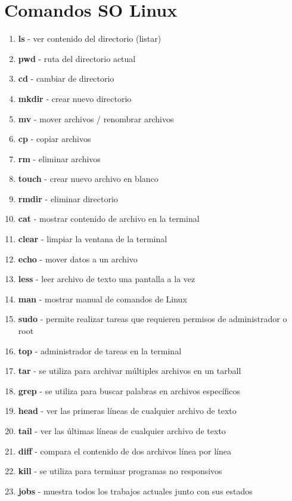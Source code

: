 \chapter{Comandos SO Linux}


\begin{enumerate}
\item \textbf{ls} - ver contenido del directorio (listar)
\item \textbf{pwd} - ruta del directorio actual
\item \textbf{cd} - cambiar de directorio
\item \textbf{mkdir} - crear nuevo directorio
\item \textbf{mv} - mover archivos / renombrar archivos
\item \textbf{cp} - copiar archivos
\item \textbf{rm} - eliminar archivos
\item \textbf{touch} - crear nuevo archivo en blanco
\item \textbf{rmdir} - eliminar directorio
\item \textbf{cat} - mostrar contenido de archivo en la terminal
\item \textbf{clear} - limpiar la ventana de la terminal
\item \textbf{echo} - mover datos a un archivo
\item \textbf{less} - leer archivo de texto una pantalla a la vez
\item \textbf{man} - mostrar manual de comandos de Linux
\item \textbf{sudo} - permite realizar tareas que requieren permisos de administrador o root
\item \textbf{top} - administrador de tareas en la terminal
\item \textbf{tar} - se utiliza para archivar múltiples archivos en un tarball
\item \textbf{grep} - se utiliza para buscar palabras en archivos específicos
\item \textbf{head} - ver las primeras líneas de cualquier archivo de texto
\item \textbf{tail} - ver las últimas líneas de cualquier archivo de texto
\item \textbf{diff} - compara el contenido de dos archivos línea por línea
\item \textbf{kill} - se utiliza para terminar programas no responsivos
\item \textbf{jobs} - muestra todos los trabajos actuales junto con sus estados

\end{enumerate}
